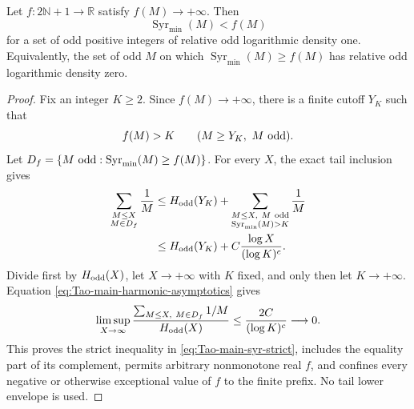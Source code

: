 \begin{theorem}
\label{thm:Tao-main-syr-repaired}
Let \(f:2\mathbb N+1\to\mathbb R\) satisfy
\(f(M)\to+\infty\).  Then
\begin{equation}
\label{eq:Tao-main-syr-strict}
 \operatorname{Syr}_{\min}(M)<f(M)
\end{equation}
for a set of odd positive integers of relative odd logarithmic density one.
Equivalently, the set of odd \(M\) on which
\(\operatorname{Syr}_{\min}(M)\geq f(M)\) has relative odd logarithmic
density zero.
\end{theorem}

\begin{proof}
Fix an integer \(K\geq2\).  Since \(f(M)\to+\infty\), there is a finite
cutoff \(Y_K\) such that
\[
 f(M)>K\qquad(M\geq Y_K,\ M\ {\rm odd}).
\]
Let
\(D_f=\{M\ {\rm odd}:\operatorname{Syr}_{\min}(M)\geq f(M)\}\).
For every \(X\), the exact tail inclusion gives
\begin{align}
 \sum_{\substack{M\leq X\\M\in D_f}}\frac1M
 &\leq H_{\rm odd}(Y_K)
 +\sum_{\substack{M\leq X,\ M\ {\rm odd}\\
          \operatorname{Syr}_{\min}(M)>K}}\frac1M\notag\\
 &\leq H_{\rm odd}(Y_K)
 +C\frac{\log X}{(\log K)^c}.
\label{eq:Tao-main-fixed-K-tail}
\end{align}
Divide first by \(H_{\rm odd}(X)\), let \(X\to+\infty\) with \(K\)
fixed, and only then let \(K\to+\infty\).  Equation
\eqref{eq:Tao-main-harmonic-asymptotics} gives
\[
 \limsup_{X\to\infty}
 \frac{\sum_{M\leq X,\ M\in D_f}1/M}{H_{\rm odd}(X)}
 \leq\frac{2C}{(\log K)^c}\longrightarrow0.
\]
This proves the strict inequality in \eqref{eq:Tao-main-syr-strict}, includes
the equality part of its complement, permits arbitrary nonmonotone real
\(f\), and confines every negative or otherwise exceptional value of \(f\)
to the finite prefix.  No tail lower envelope is used.
\end{proof}

